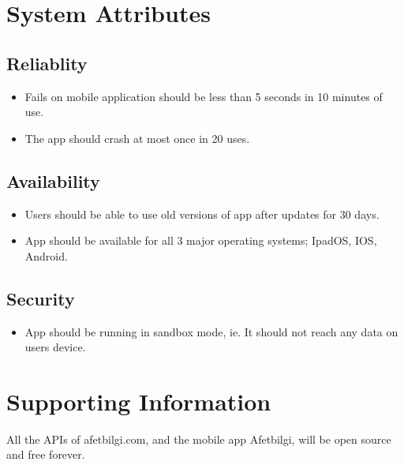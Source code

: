 \section{System Attributes}
\subsection{Reliablity}
\begin{itemize}
    \item Fails on mobile application should be less than 5 seconds in 10 minutes of use.
    \item The app should crash at most once in 20 uses.
\end{itemize}

\subsection{Availability}
\begin{itemize}
    \item Users should be able to use old versions of app after updates for 30 days.
    \item App should be available for all 3 major operating systems; IpadOS, IOS, Android.
\end{itemize}

\subsection{Security}
\begin{itemize}
    \item App should be running in sandbox mode, ie. It should not reach any data on users device.
\end{itemize}

\section{Supporting Information}
All the APIs of afetbilgi.com, and the mobile app Afetbilgi, will be open source and free forever.